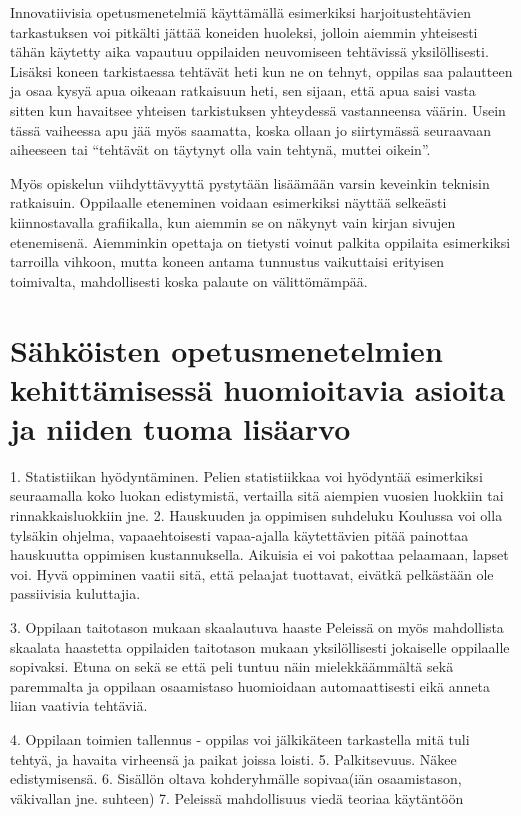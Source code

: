 \documentclass[utf8,bachelor]{gradu3}
\begin{document}
Innovatiivisia opetusmenetelmiä käyttämällä esimerkiksi harjoitustehtävien tarkastuksen voi pitkälti jättää koneiden huoleksi, jolloin aiemmin yhteisesti tähän käytetty aika vapautuu oppilaiden neuvomiseen tehtävissä yksilöllisesti. Lisäksi koneen tarkistaessa tehtävät heti kun ne on tehnyt, oppilas saa palautteen ja osaa kysyä apua oikeaan ratkaisuun heti, sen sijaan, että apua saisi vasta sitten kun havaitsee yhteisen tarkistuksen yhteydessä vastanneensa väärin. Usein tässä vaiheessa apu jää myös saamatta, koska ollaan jo siirtymässä seuraavaan aiheeseen tai “tehtävät on täytynyt olla vain tehtynä, muttei oikein”.

Myös opiskelun viihdyttävyyttä pystytään lisäämään varsin keveinkin teknisin ratkaisuin. Oppilaalle eteneminen voidaan esimerkiksi näyttää selkeästi kiinnostavalla grafiikalla, kun aiemmin se on näkynyt vain kirjan sivujen etenemisenä. Aiemminkin opettaja on tietysti voinut palkita oppilaita esimerkiksi tarroilla vihkoon, mutta koneen antama tunnustus vaikuttaisi erityisen toimivalta, mahdollisesti koska palaute on välittömämpää.

\section{Sähköisten opetusmenetelmien kehittämisessä huomioitavia asioita ja niiden tuoma lisäarvo}
1. Statistiikan hyödyntäminen.
Pelien statistiikkaa voi hyödyntää esimerkiksi seuraamalla koko luokan edistymistä, vertailla sitä aiempien vuosien luokkiin tai rinnakkaisluokkiin jne.
2. Hauskuuden ja oppimisen suhdeluku
	Koulussa voi olla tylsäkin ohjelma, vapaaehtoisesti vapaa-ajalla käytettävien pitää painottaa hauskuutta oppimisen kustannuksella.
Aikuisia ei voi pakottaa pelaamaan, lapset voi. Hyvä oppiminen vaatii sitä, että pelaajat tuottavat, eivätkä pelkästään ole passiivisia kuluttajia. %

3. Oppilaan taitotason mukaan skaalautuva haaste \parencite[][]{koulunArki} \parencite[][13-14]{gamePaper}
Peleissä on myös mahdollista skaalata haastetta oppilaiden taitotason mukaan yksilöllisesti jokaiselle oppilaalle sopivaksi. Etuna on sekä se että peli tuntuu näin mielekkäämmältä sekä paremmalta ja oppilaan osaamistaso huomioidaan automaattisesti eikä anneta liian vaativia tehtäviä.


4. Oppilaan toimien tallennus - oppilas voi jälkikäteen tarkastella mitä tuli tehtyä, ja havaita virheensä ja paikat joissa loisti.
5. Palkitsevuus. Näkee edistymisensä.
6. Sisällön oltava kohderyhmälle sopivaa(iän osaamistason, väkivallan jne. suhteen) 
7. Peleissä mahdollisuus viedä teoriaa käytäntöön
\end{document}
